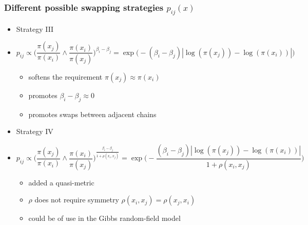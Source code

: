 \begin{frame}
		\frametitle{ Different possible swapping strategies $p_{ij}( x )$ }

	\begin{itemize}
		\item[] Strategy III 
		\item[] 
	$$p_{ij} \propto \Big( \frac{\pi (x_j)}{\pi( x_i )} \wedge \frac{\pi (x_i)}{\pi( x_j )} \Big)^{\beta_i - \beta_j} = \exp \Big( - (\beta_i - \beta_j)| \log ( \pi(x_j) ) - \log ( \pi(x_i) ) | \Big)$$
		\begin{itemize}		
 			\item softens the requirement  $\pi (x_j) \approx \pi (x_i)$
			\item promotes $\beta_i - \beta_j \approx 0$ 
			\item promotes swaps between adjacent chains 
		\end{itemize}
	
		\item[] Strategy IV 
		\item[] 
	$$p_{ij} \propto \Big( \frac{\pi (x_j)}{\pi( x_i )} \wedge \frac{\pi (x_i)}{\pi( x_j )} \Big)^\frac{\beta_i - \beta_j}{1 + \rho(x_i, x_j)} = \exp \Big( - \frac{(\beta_i - \beta_j)| \log ( \pi(x_j) ) - \log ( \pi(x_i) ) |}{{1 + \rho(x_i, x_j)}} \Big)$$
		\begin{itemize}		
 			\item added a quasi-metric 
			\item $\rho$ does not require symmetry $\rho(x_i, x_j) = \rho(x_j, x_i)$  
			\item could be of use in the Gibbs random-field model
		\end{itemize}

	\end{itemize}

\end{frame}






